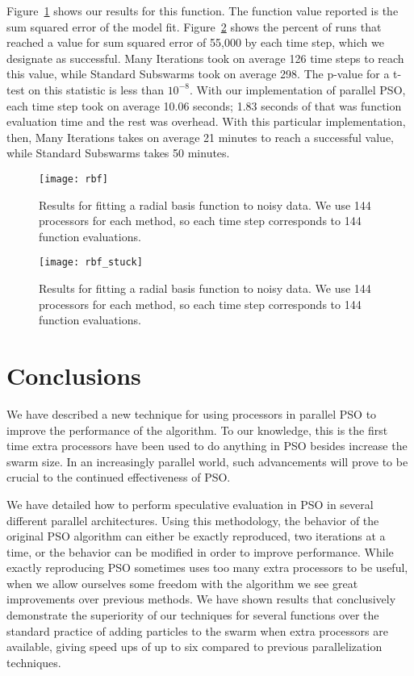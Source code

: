 \documentclass[ms,electronic,twosidetoc,letterpaper,chaptercenter,parttop,equalmargins]{byumsphd}
\newcommand{\fig}[1]{Figure~\ref{fig:#1}}
\begin{document}
\fig{rbf} shows our results for this function.  The function value reported is
the sum squared error of the model fit.  \fig{rbf-stuck} shows the percent of
runs that reached a value for sum squared error of 55,000 by each time step,
which we designate as successful.  Many Iterations took on average 126 time
steps to reach this value, while Standard Subswarms took on average 298.  The
p-value for a t-test on this statistic is less than $10^{-8}$.  With our
implementation of parallel PSO, each time step took on average 10.06 seconds;
1.83 seconds of that was function evaluation time and the rest was overhead.
With this particular implementation, then, Many Iterations takes on average 21
minutes to reach a successful value, while Standard Subswarms takes 50 minutes.

\begin{figure}
  \centering
  \texttt{[image: rbf]}
  \caption{Results for fitting a radial basis function to noisy data.  We use
  144 processors for each method, so each time step corresponds to 144 function
  evaluations.}
  \label{fig:rbf}
\end{figure}

\begin{figure}
  \centering
  \texttt{[image: rbf\_stuck]}
  \caption{Results for fitting a radial basis function to noisy data.  We use
  144 processors for each method, so each time step corresponds to 144 function
  evaluations.}
  \label{fig:rbf-stuck}
\end{figure}


\chapter{Conclusions}
\label{sec:conclusion}

We have described a new technique for using processors in parallel PSO to
improve the performance of the algorithm.  To our knowledge, this is the first
time extra processors have been used to do anything in PSO besides increase the
swarm size.  In an increasingly parallel world, such advancements will prove to
be crucial to the continued effectiveness of PSO.

We have detailed how to perform speculative evaluation in PSO in several
different parallel architectures.  Using this methodology, the behavior of the
original PSO algorithm can either be exactly reproduced, two iterations at a
time, or the behavior can be modified in order to improve performance.  While
exactly reproducing PSO sometimes uses too many extra processors to be useful,
when we allow ourselves some freedom with the algorithm we see great
improvements over previous methods.  We have shown results that conclusively
demonstrate the superiority of our techniques for several functions over the
standard practice of adding particles to the swarm when extra processors are
available, giving speed ups of up to six compared to previous parallelization
techniques.
\end{document}
